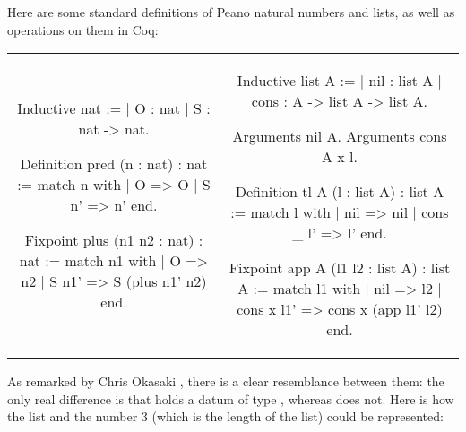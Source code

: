 \documentclass{article}
\newenvironment{no_padding_center}
    {\parskip=0pt\par\nopagebreak\centering}
    {\par\noindent}
\begin{document}
Here are some standard definitions of Peano natural numbers and lists, as well as operations on them in Coq:

\begin{no_padding_center}
    \begin{tabular}{c c}
        \begin{coq}
Inductive nat :=
  | O : nat
  | S : nat -> nat.




Definition pred (n : nat) : nat :=
  match n with
  | O => O
  | S n' => n'
  end.

Fixpoint plus (n1 n2 : nat) : nat :=
  match n1 with
  | O => n2
  | S n1' => S (plus n1' n2)
  end.
        \end{coq} &
        \begin{coq}
Inductive list A :=
  | nil : list A
  | cons : A -> list A -> list A.

Arguments nil {A}.
Arguments cons {A} x l.

Definition tl {A} (l : list A) : list A :=
  match l with
  | nil => nil
  | cons _ l' => l'
  end.

Fixpoint app {A} (l1 l2 : list A) : list A :=
  match l1 with
  | nil => l2
  | cons x l1' => cons x (app l1' l2)
  end.
        \end{coq}
    \end{tabular}
\end{no_padding_center}

As remarked by Chris Okasaki \cite{okasaki_1998}, there is a clear resemblance between them: the only real difference is that  holds a datum of type , whereas  does not. Here is how the list \coqinline{[7; 5; 8]} and the number 3 (which is the length of the list) could be represented:

\begin{center}
\end{center}
\end{document}
